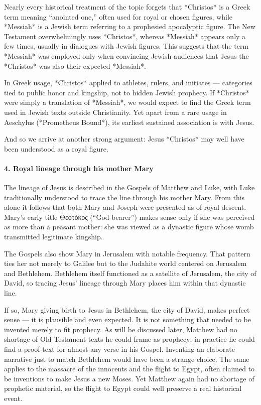 Nearly every historical treatment of the topic forgets that *Christos* is a Greek term meaning “anointed one,” often used for royal or chosen figures, while *Messiah* is a Jewish term referring to a prophesied apocalyptic figure.
The New Testament overwhelmingly uses *Christos*, whereas *Messiah* appears only a few times, usually in dialogues with Jewish figures.
This suggests that the term *Messiah* was employed only when convincing Jewish audiences that Jesus the *Christos* was also their expected *Messiah*.

In Greek usage, *Christos* applied to athletes, rulers, and initiates — categories tied to public honor and kingship, not to hidden Jewish prophecy.
If *Christos* were simply a translation of *Messiah*, we would expect to find the Greek term used in Jewish texts outside Christianity.
Yet apart from a rare usage in Aeschylus (*Prometheus Bound*), its earliest sustained association is with Jesus.

And so we arrive at another strong argument: Jesus *Christos* may well have been understood as a royal figure.

\paragraph{4.
Royal lineage through his mother Mary}\label{par:royal-lineage-through-his-mother-mary}

The lineage of Jesus is described in the Gospels of Matthew and Luke, with Luke traditionally understood to trace the line through his mother Mary.
From this alone it follows that both Mary and Joseph were presented as of royal descent.
Mary’s early title Θεοτόκος (“God-bearer”) makes sense only if she was perceived as more than a peasant mother: she was viewed as a dynastic figure whose womb transmitted legitimate kingship.

The Gospels also show Mary in Jerusalem with notable frequency.
That pattern ties her not merely to Galilee but to the Judahite world centered on Jerusalem and Bethlehem.
Bethlehem itself functioned as a satellite of Jerusalem, the city of David, so tracing Jesus’ lineage through Mary places him within that dynastic line.

If so, Mary giving birth to Jesus in Bethlehem, the city of David, makes perfect sense — it is plausible and even expected.
It is not something that needed to be invented merely to fit prophecy.
As will be discussed later, Matthew had no shortage of Old Testament texts he could frame as prophecy; in practice he could find a proof-text for almost any verse in his Gospel.
Inventing an elaborate narrative just to match Bethlehem would have been a strange choice.
The same applies to the massacre of the innocents and the flight to Egypt, often claimed to be inventions to make Jesus a new Moses.
Yet Matthew again had no shortage of prophetic material, so the flight to Egypt could well preserve a real historical event.

